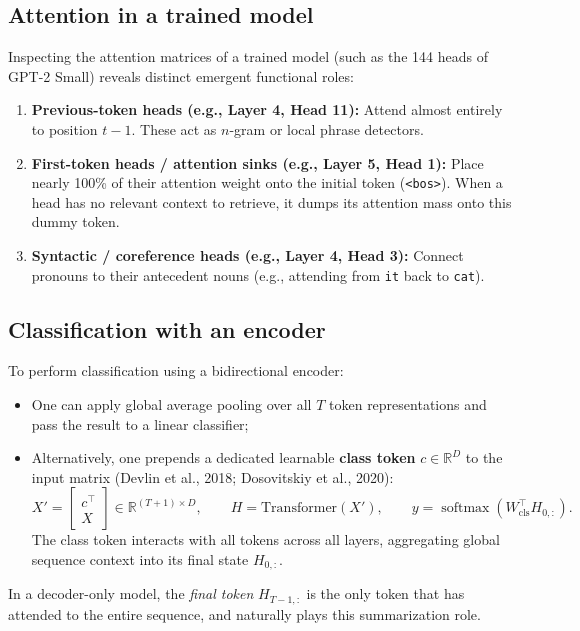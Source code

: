 \documentclass[11pt,a4paper]{article}
\newcommand{\R}{\mathbb{R}}
\DeclareMathOperator{\softmax}{softmax}
\newcommand{\slides}[1]{\par\nopagebreak\noindent{\normalfont\small\emph{(slides #1)}}\par\nopagebreak\vspace{2pt}}
\theoremstyle{definition}
\theoremstyle{plain}
\begin{document}
\subsection{Attention in a trained model}\slides{65 / 84}
Inspecting the attention matrices of a trained model (such as the 144 heads of GPT-2 Small) reveals distinct emergent functional roles:
\begin{enumerate}
\item \textbf{Previous-token heads (e.g., Layer 4, Head 11):} Attend almost entirely to position $t-1$. These act as $n$-gram or local phrase detectors.
\item \textbf{First-token heads / attention sinks (e.g., Layer 5, Head 1):} Place nearly 100\% of their attention weight onto the initial token (\texttt{<bos>}). When a head has no relevant context to retrieve, it dumps its attention mass onto this dummy token.
\item \textbf{Syntactic / coreference heads (e.g., Layer 4, Head 3):} Connect pronouns to their antecedent nouns (e.g., attending from \texttt{it} back to \texttt{cat}).
\end{enumerate}

\subsection{Classification with an encoder}\slides{66 / 84}
To perform classification using a bidirectional encoder:
\begin{itemize}
\item One can apply global average pooling over all $T$ token representations and pass the result to a linear classifier;
\item Alternatively, one prepends a dedicated learnable \textbf{class token} $c \in \R^D$ to the input matrix (Devlin et al., 2018; Dosovitskiy et al., 2020):
\begin{equation}
X' = \begin{bmatrix} c^\top \\ X \end{bmatrix} \in \R^{(T+1) \times D}, \qquad H = \mathrm{Transformer}(X'), \qquad y = \softmax(W_{\text{cls}}^\top H_{0,:}).
\end{equation}
The class token interacts with all tokens across all layers, aggregating global sequence context into its final state $H_{0,:}$.
\end{itemize}
In a decoder-only model, the \emph{final token} $H_{T-1,:}$ is the only token that has attended to the entire sequence, and naturally plays this summarization role.
\end{document}
